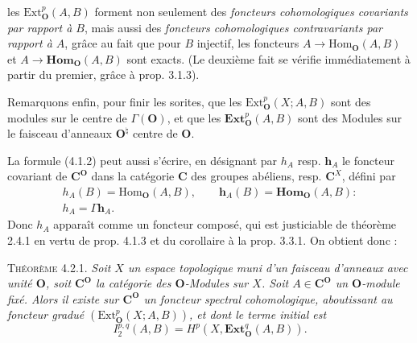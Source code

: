 \clearpage
{}

\noindent les $\mathrm{Ext}_{\mathbf O}^p(A,B)$ forment non seulement des
\textit{foncteurs cohomologiques covariants par rapport à $B$}, mais aussi des
\textit{foncteurs cohomologiques contravariants par rapport à $A$}, grâce au
fait que pour $B$ injectif, les foncteurs
$A\to\mathrm{Hom}_{\mathbf O}(A,B)$ et
$A\to\mathbf{Hom}_{\mathbf O}(A,B)$ sont exacts. (Le deuxième fait se vérifie
immédiatement à partir du premier, grâce à prop. 3.1.3).

Remarquons enfin, pour finir les sorites, que les
$\mathrm{Ext}_{\mathbf O}^p(X;A,B)$ sont des modules sur le centre de $\Gamma({\mathbf O})$, et
que les $\mathbf{Ext}_{\mathbf O}^p(A,B)$ sont des Modules sur le faisceau d'anneaux
${\mathbf O}^\natural$ centre de ${\mathbf O}$.

La formule (4.1.2) peut aussi s'écrire, en désignant par $h_A$ resp.
$\mathbf{h}_A$ le foncteur covariant de $\mathbf C^{\mathbf O}$ dans la catégorie $\mathbf C$ des
groupes abéliens, resp. $\mathbf C^X$, défini par
\[
\tag{42.4}
\begin{gathered}
h_A(B)=\mathrm{Hom}_{\mathbf O}(A,B),\qquad
\mathbf{h}_A(B)=\mathbf{Hom}_{\mathbf O}(A,B):\\
h_A=\Gamma\mathbf{h}_A.
\end{gathered}
\]
Donc $h_A$ apparaît comme un foncteur composé, qui est justiciable de
théorème 2.4.1 en vertu de prop. 4.1.3 et du corollaire à la prop. 3.3.1. On
obtient donc :

\textsc{Théorème 4.2.1.} \textit{Soit $X$ un espace topologique muni
d'un faisceau d'anneaux avec unité ${\mathbf O}$, soit $\mathbf C^{\mathbf O}$ la catégorie des
${\mathbf O}$-Modules sur $X$. Soit $A\in \mathbf C^{\mathbf O}$ un ${\mathbf O}$-module fixé. Alors il existe sur
$\mathbf C^{\mathbf O}$ un foncteur spectral cohomologique, aboutissant au foncteur gradué
$(\mathrm{Ext}_{\mathbf O}^p(X;A,B))$, et dont le terme initial est}
\[
\tag{4.2.5}
I_2^{p,q}(A,B)=H^p(X,\mathbf{Ext}_{\mathbf O}^q(A,B)).
\]

